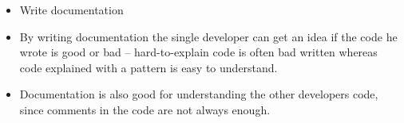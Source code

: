 \documentclass[Main]{subfiles}
\begin{document}
\begin{itemize}
	\item Write documentation
	\item[] By writing documentation the single developer can get an idea if the code he wrote is good or bad -- hard-to-explain code is often bad written whereas code explained with a pattern is easy to understand.
	\item[] Documentation is also good for understanding the other developers code, since comments in the code are not always enough.
	
\end{itemize}
\end{document}
